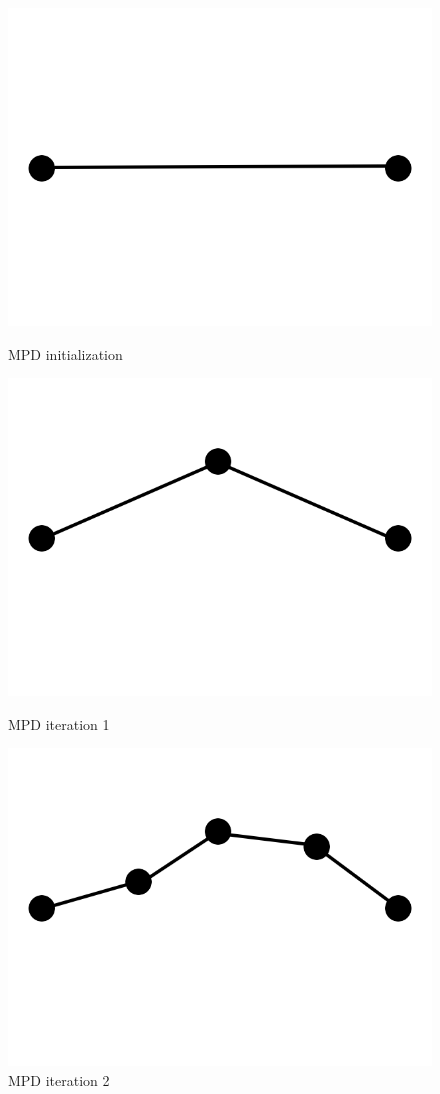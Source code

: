 \documentclass[11pt,a4paper,twoside,openright]{report}
\begin{document}
\begin{figure}[!htb]
  \includegraphics[width=\linewidth]{mpd0.png}
  \caption{MPD initialization}\label{fig:mpd0}
\endminipage\hfill
{}
  \includegraphics[width=\linewidth]{mpd1.png}
  \caption{MPD iteration 1}\label{fig:mpd1}
\endminipage\hfill
{}%
  \includegraphics[width=\linewidth]{mpd2.png}
  \caption{MPD iteration 2}\label{fig:mpd2}
\endminipage
\end{figure}
\end{document}
